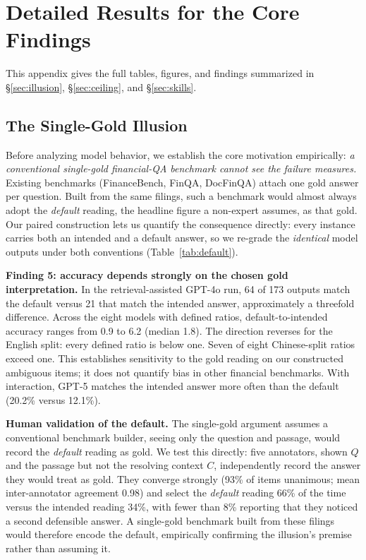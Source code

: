 \section{Detailed Results for the Core Findings}
\label{app:maindetails}

This appendix gives the full tables, figures, and findings summarized in \S\ref{sec:illusion},
\S\ref{sec:ceiling}, and \S\ref{sec:skills}.

\subsection{The Single-Gold Illusion}

Before analyzing model behavior, we establish the core motivation empirically:
\emph{a conventional single-gold financial-QA benchmark cannot see the failure
\fininteract measures.} Existing benchmarks (FinanceBench, FinQA, DocFinQA)
attach one gold answer per question. Built from the same filings, such a
benchmark would almost always adopt the \emph{default} reading, the headline
figure a non-expert assumes, as that gold. Our paired construction lets us
quantify the consequence directly: every instance carries both an intended and a
default answer, so we re-grade the \emph{identical} model outputs under both
conventions (Table~\ref{tab:default}).



\textbf{Finding 5: accuracy depends strongly on the chosen gold interpretation.} In the retrieval-assisted GPT-4o run, 64 of 173 outputs match the default versus 21 that match the intended answer, approximately a threefold difference. Across the eight models with defined ratios, default-to-intended accuracy ranges from 0.9 to 6.2 (median 1.8). The direction reverses for the English split: every defined ratio is below one. Seven of eight Chinese-split ratios exceed one. This establishes sensitivity to the gold reading on our constructed ambiguous items; it does not quantify bias in other financial benchmarks. With interaction, GPT-5 matches the intended answer more often than the default (20.2\% versus 12.1\%).

\textbf{Human validation of the default.} The single-gold argument assumes a conventional
benchmark builder, seeing only the question and passage, would record the \emph{default}
reading as gold. We test this directly: five annotators, shown $Q$ and the passage but not
the resolving context $C$, independently record the answer they would treat as gold. They
converge strongly (93\% of items unanimous; mean inter-annotator agreement 0.98) and
select the \emph{default} reading 66\% of the time versus the intended reading 34\%, with
fewer than 8\% reporting that they noticed a second defensible answer. A single-gold
benchmark built from these filings would therefore encode the default, empirically confirming
the illusion's premise rather than assuming it.

